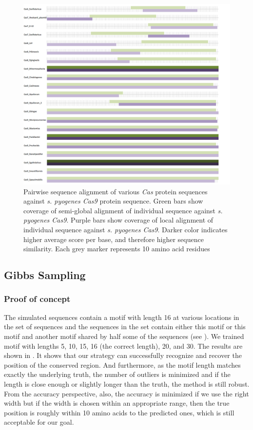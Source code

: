 \documentclass[11pt, oneside]{article}
\begin{document}
\begin{figure}[ht]
  \centering
  \includegraphics[scale = 0.45]{images/dp_figure2}
      \caption{Pairwise sequence alignment of various \textit{Cas} protein sequences against \textit{s. pyogenes Cas9} protein sequence. Green bars show coverage of semi-global alignment of individual sequence against \textit{s. pyogenes Cas9}. Purple bars show coverage of local alignment of individual sequence against \textit{s. pyogenes Cas9}. Darker color indicates higher average score per base, and therefore higher sequence similarity. Each grey marker represents 10 amino acid residues}
      \label{dp2}
\end{figure}

\subsection{Gibbs Sampling}

\subsubsection{Proof of concept}

The simulated sequences contain a motif with length 16 at various locations in the set of sequences and the sequences in the set contain either this motif or this motif and another motif shared by half some of the sequences (see ). We trained motif with lengths 5, 10, 15, 16 (the correct length), 20, and 30. The results are shown in . It shows that our strategy can successfully recognize and recover the position of the conserved region. And furthermore, as the motif length matches exactly the underlying truth, the number of outliers is minimized and if the length is close enough or slightly longer than the truth, the method is still robust. From the accuracy perspective, also, the accuracy is minimized if we use the right width but if the width is chosen within an appropriate range, then the true position is roughly within 10 amino acids to the predicted ones, which is still acceptable for our goal.
\end{document}
